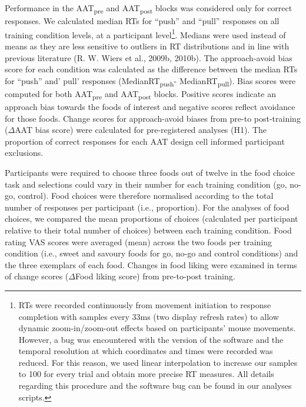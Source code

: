 \documentclass[man,floatsintext]{apa6}
\let\rmarkdownfootnote\footnote%
\def\footnote{\protect\rmarkdownfootnote}
\begin{document}
\par

Performance in the AAT\textsubscript{pre} and AAT\textsubscript{post} blocks was considered only for correct responses. We calculated median RTs for \enquote{push} and \enquote{pull} responses on all training condition levels, at a participant level\footnote{RTs were recorded continuously from movement initiation to response completion with samples every 33ms (two display refresh rates) to allow dynamic zoom-in/zoom-out effects based on participants' mouse movements. However, a bug was encountered with the version of the software and the temporal resolution at which coordinates and times were recorded was reduced. For this reason, we used linear interpolation to increase our samples to 100 for every trial and obtain more precise RT measures. All details regarding this procedure and the software bug can be found in our analyses scripts.}. Medians were used instead of means as they are less sensitive to outliers in RT distributions and in line with previous literature (R. W. Wiers et al., 2009b, 2010b). The approach-avoid bias score for each condition was calculated as the difference between the median RTs for \enquote{push} and' pull' responses (MedianRT\textsubscript{push}- MedianRT\textsubscript{pull}). Bias scores were computed for both AAT\textsubscript{pre} and AAT\textsubscript{post} blocks. Positive scores indicate an approach bias towards the foods of interest and negative scores reflect avoidance for those foods. Change scores for approach-avoid biases from pre-to post-training (\(\Delta\)AAT bias score) were calculated for pre-registered analyses (H1). The proportion of correct responses for each AAT design cell informed participant exclusions.

\par

Participants were required to choose three foods out of twelve in the food choice task and selections could vary in their number for each training condition (go, no-go, control). Food choices were therefore normalised according to the total number of responses per participant (i.e., proportion). For the analyses of food choices, we compared the mean proportions of choices (calculated per participant relative to their total number of choices) between each training condition. Food rating VAS scores were averaged (mean) across the two foods per training condition (i.e., sweet and savoury foods for go, no-go and control conditions) and the three exemplars of each food. Changes in food liking were examined in terms of change scores (\(\Delta\)Food liking score) from pre-to-post training.
\end{document}

